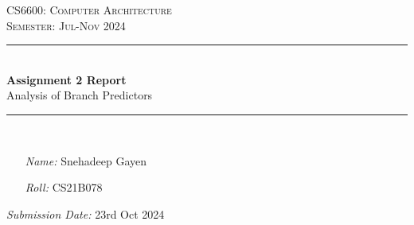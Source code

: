 \thispagestyle{empty} %
\begin{titlepage}
\begin{center}
	\doublespacing %
	\textsc{\huge CS6600: Computer Architecture}\\
	\vspace{2.0cm} %
	\onehalfspacing
	\textsc{\Large Semester: Jul-Nov 2024}\\
	\vspace{1.0cm}
	
	\rule{\linewidth}{0.5mm}\\ %
	\vspace{1.4cm}
	\huge \textbf{Assignment 2 Report}\\ %
	\vspace{1cm}
	\large Analysis of Branch Predictors \normalsize
	\vspace{0.3cm}
	\rule{\linewidth}{0.5mm}\\
	\vspace{2.4cm}
\end{center}

\onehalfspacing

\begin{minipage}[t]{0.8\textwidth}
	\begin{itemize}
	\item[\emph{Name:}] Snehadeep Gayen
	\item[\emph{Roll:}] CS21B078
	\end{itemize}
\end{minipage}

\vspace{2.9cm}

\flushright \emph{Submission Date:} 23rd Oct 2024
\end{titlepage}
\restoregeometry

\onehalfspacing